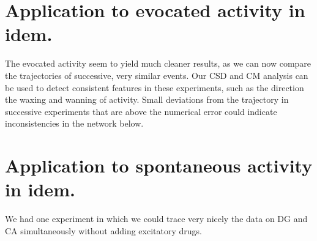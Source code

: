 \documentclass{article}
\begin{document}
\section{Application to evocated activity in idem.}

The evocated activity seem to yield much cleaner results, as we can now compare the trajectories of successive, very similar events. Our CSD and CM analysis can be used to detect consistent features in these experiments, such as the direction the waxing and wanning of activity. Small deviations from the trajectory in successive experiments that are above the numerical error could indicate inconsistencies in the network below. 

\section{Application to spontaneous activity in idem.}

We had one experiment in which we could trace very nicely the data on DG and CA simultaneously without adding excitatory drugs. 
\end{document}
